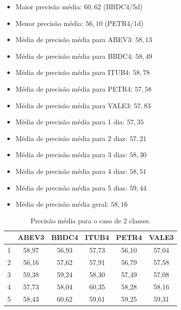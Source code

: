 \documentclass[grad,numbers]{coppe}
\begin{document}
				\begin{itemize}
	 				\item Maior precisão média: $60,62$ (BBDC4/5d)
	 				\item Menor precisão média: $56,10$ (PETR4/1d)
	 				\item Média de precisão média para ABEV3: $58,13$
	 				\item Média de precisão média para BBDC4: $58,49$
	 				\item Média de precisão média para ITUB4: $58,78$
	 				\item Média de precisão média para PETR4: $57,58$
	 				\item Média de precisão média para VALE3: $57,83$
	 				\item Média de precisão média para 1 dia: $57,35$
	 				\item Média de precisão média para 2 dias: $57,21$
	 				\item Média de precisão média para 3 dias: $58,30$
	 				\item Média de precisão média para 4 dias: $58,51$
	 				\item Média de precisão média para 5 dias: $59,44$
	 				\item Média de precisão média geral: $58,16$
	 			\end{itemize}
	 			\begin{table}[h]
	 				\caption{Precisão média para o caso de 2 classes.}
	 				\label{tab:2c_pr_analysis}
	 				\centering
	 				{\footnotesize
	 					\begin{tabular}{|c|c|c|c|c|c|}
	 						\hline
	 						\diagbox[linewidth=0.2pt, width=\dimexpr \textwidth/10+2\tabcolsep\relax, height=0.8cm]{Dias}{Ativo}
	 						& ABEV3 & BBDC4 & ITUB4 & PETR4 & VALE3\\
	 						\hline
	 						1 & 58,97 & 56,93 & 57,73 & 56,10 & 57,04 \\
	 						2 & 56,16 & 57,62 & 57,91 & 56,79 & 57,58 \\
	 						3 & 59,38 & 59,24 & 58,30 & 57,49 & 57,08 \\
	 						4 & 57,73 & 58,04 & 60,35 & 58,28 & 58,16 \\
	 						5 & 58,43 & 60,62 & 59,61 & 59,25 & 59,31 \\
	 						\hline
	 				\end{tabular}}
	 			\end{table}
\end{document}
